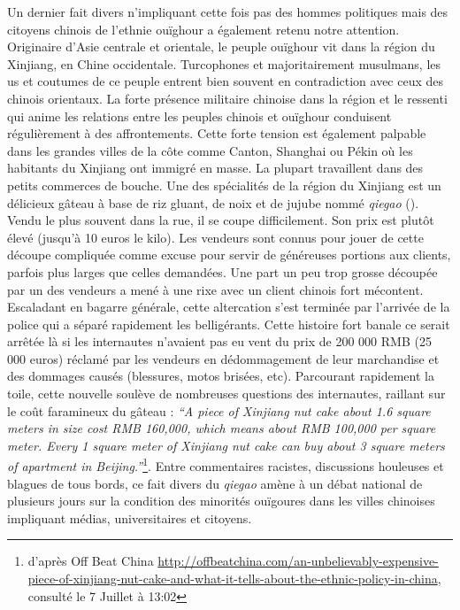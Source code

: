 Un dernier fait divers n'impliquant cette fois pas des hommes politiques mais des citoyens chinois de l'ethnie ouïghour a également retenu notre attention. Originaire d'Asie centrale et orientale, le peuple ouïghour vit dans la région du Xinjiang, en Chine occidentale. Turcophones et majoritairement musulmans, les us et coutumes de ce peuple entrent bien souvent en contradiction avec ceux des chinois orientaux. La forte présence militaire chinoise dans la région et le ressenti qui anime les relations entre les peuples chinois et ouïghour conduisent régulièrement à des affrontements. Cette forte tension est également palpable dans les grandes villes de la côte comme Canton, Shanghai ou Pékin où les habitants du Xinjiang ont immigré en masse. La plupart travaillent dans des petits commerces de bouche. Une des spécialités de la région du Xinjiang est un délicieux gâteau à base de riz gluant, de noix et de jujube nommé \textit{qiegao} (). Vendu le plus souvent dans la rue, il se coupe difficilement. Son prix est plutôt élevé (jusqu'à 10 euros le kilo). Les vendeurs sont connus pour jouer de cette découpe compliquée comme excuse pour servir de généreuses portions aux clients, parfois plus larges que celles demandées. Une part un peu trop grosse découpée par un des vendeurs a mené à une rixe avec un client chinois fort mécontent. Escaladant en bagarre générale, cette altercation s'est terminée par l'arrivée de la police qui a séparé rapidement les belligérants. Cette histoire fort banale ce serait arrêtée là si les internautes n'avaient pas eu vent du prix de 200 000 RMB (25 000 euros) réclamé par les vendeurs en dédommagement de leur marchandise et des dommages causés (blessures, motos brisées, etc). Parcourant rapidement la toile, cette nouvelle soulève de nombreuses questions des internautes, raillant sur le coût faramineux du gâteau : \textit{``A piece of Xinjiang nut cake about 1.6 square meters in size cost RMB 160,000, which means about RMB 100,000 per square meter. Every 1 square meter of Xinjiang nut cake can buy about 3 square meters of apartment in Beijing.''}\footnote{d'après Off Beat China \url{http://offbeatchina.com/an-unbelievably-expensive-piece-of-xinjiang-nut-cake-and-what-it-tells-about-the-ethnic-policy-in-china}, consulté le 7 Juillet à 13:02}. Entre commentaires racistes, discussions houleuses et blagues de tous bords, ce fait divers du \textit{qiegao} amène à un débat national de plusieurs jours sur la condition des minorités ouïgoures dans les villes chinoises impliquant médias, universitaires et citoyens. 


